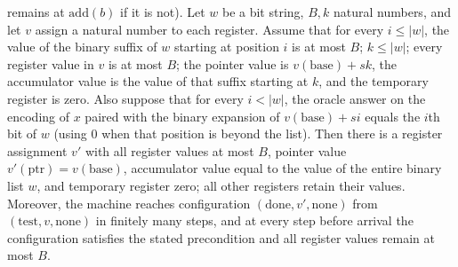 \begin{theorem}
remains at $\mathrm{add}(b)$ if it is not). Let $w$ be a bit string, $B,k$ natural
numbers, and let $v$ assign a natural number to each register. Assume that for every
$i\le |w|$, the value of the binary suffix of $w$ starting at position $i$ is at most
$B$; $k\le |w|$; every register value in $v$ is at most $B$; the pointer value is
$v(\mathrm{base})+sk$, the accumulator value is the value of that suffix starting at
$k$, and the temporary register is zero. Also suppose that for every $i<|w|$, the oracle
answer on the encoding of $x$ paired with the binary expansion of $v(\mathrm{base})+si$
equals the $i$th bit of $w$ (using $0$ when that position is beyond the list). Then
there is a register assignment $v'$ with all register values at most $B$, pointer value
$v'(\mathrm{ptr})=v(\mathrm{base})$, accumulator value equal to the value of the entire
binary list $w$, and temporary register zero; all other registers retain their values.
Moreover, the machine reaches configuration $(\mathrm{done},v',\mathrm{none})$ from
$(\mathrm{test},v,\mathrm{none})$ in finitely many steps, and at every step before
arrival the configuration satisfies the stated precondition and all register values
remain at most $B$.
\end{theorem}

